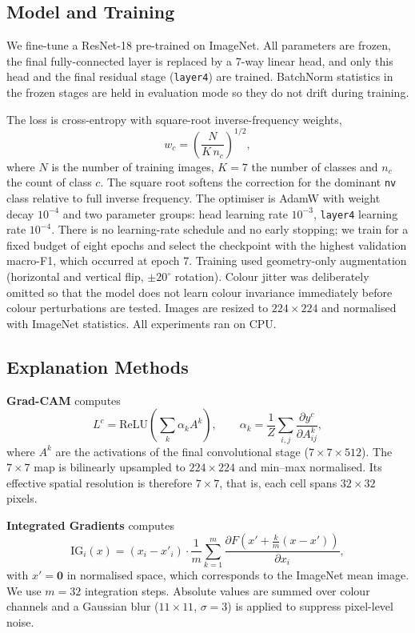 \documentclass[conference]{IEEEtran}
\begin{document}
\subsection{Model and Training}
We fine-tune a ResNet-18 \cite{he2016} pre-trained on ImageNet. All
parameters are frozen, the final fully-connected layer is replaced by a
7-way linear head, and only this head and the final residual stage
(\texttt{layer4}) are trained. BatchNorm statistics in the frozen stages are
held in evaluation mode so they do not drift during training.

The loss is cross-entropy with square-root inverse-frequency weights,
\begin{equation}
w_c = \left( \frac{N}{K \, n_c} \right)^{1/2},
\end{equation}
where $N$ is the number of training images, $K{=}7$ the number of classes
and $n_c$ the count of class $c$. The square root softens the correction for
the dominant \texttt{nv} class relative to full inverse frequency. The
optimiser is AdamW \cite{loshchilov2019} with weight decay $10^{-4}$ and two
parameter groups: head learning rate $10^{-3}$, \texttt{layer4} learning
rate $10^{-4}$. There is no learning-rate schedule and no early stopping; we
train for a fixed budget of eight epochs and select the checkpoint with the
highest validation macro-F1, which occurred at epoch 7. Training used
geometry-only augmentation (horizontal and vertical flip, $\pm 20^\circ$
rotation). Colour jitter was deliberately omitted so that the model does not
learn colour invariance immediately before colour perturbations are
tested. Images are resized to $224\times224$ and normalised with ImageNet
statistics. All experiments ran on CPU.

\subsection{Explanation Methods}
\textbf{Grad-CAM} \cite{selvaraju2017} computes
\begin{equation}
L^{c} = \mathrm{ReLU}\!\left( \sum_k \alpha_k A^k \right), \qquad
\alpha_k = \frac{1}{Z}\sum_{i,j} \frac{\partial y^{c}}{\partial A^k_{ij}},
\end{equation}
where $A^k$ are the activations of the final convolutional stage
($7\times7\times512$). The $7\times7$ map is bilinearly upsampled to
$224\times224$ and min--max normalised. Its effective spatial resolution is
therefore $7\times7$, that is, each cell spans $32\times32$ pixels.

\textbf{Integrated Gradients} \cite{sundararajan2017} computes
\begin{equation}
\mathrm{IG}_i(x) = (x_i - x'_i)\cdot
\frac{1}{m}\sum_{k=1}^{m}
\frac{\partial F\!\left(x' + \tfrac{k}{m}(x-x')\right)}{\partial x_i},
\end{equation}
with $x' = \mathbf{0}$ in normalised space, which corresponds to the
ImageNet mean image. We use $m{=}32$ integration steps. Absolute values are
summed over colour channels and a Gaussian blur ($11\times11$, $\sigma{=}3$)
is applied to suppress pixel-level noise.
\end{document}
